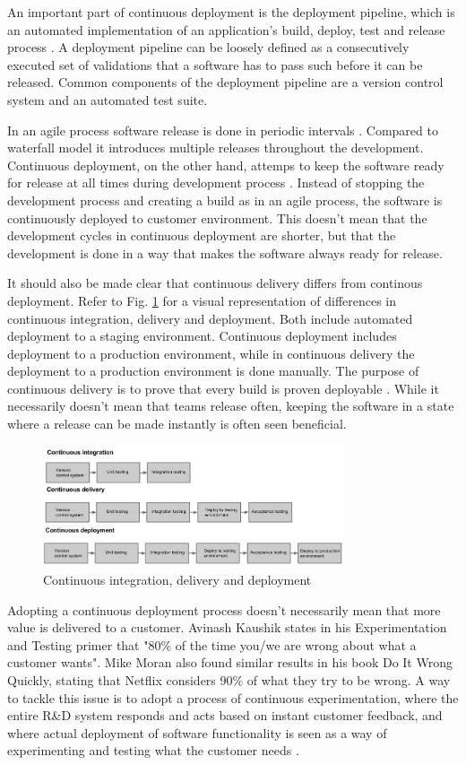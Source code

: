 \documentclass[conference]{IEEEtran}
\begin{document}
An important part of continuous deployment is the deployment pipeline, which is an automated implementation of an application's build, deploy, test and release process \cite{cdbook}. A deployment pipeline can be loosely defined as a consecutively executed set of validations that a software has to pass such before it can be released. Common components of the deployment pipeline are a version control system and an automated test suite.

In an agile process software release is done in periodic intervals \cite{cockburn2002agile}. Compared to waterfall model it introduces multiple releases throughout the development. Continuous deployment, on the other hand, attemps to keep the software ready for release at all times during development process \cite{cdbook}. Instead of stopping the development process and creating a build as in an agile process, the software is continuously deployed to customer environment. This doesn't mean that the development cycles in continuous deployment are shorter, but that the development is done in a way that makes the software always ready for release.

It should also be made clear that continuous delivery differs from continous deployment. Refer to Fig. \ref{fig1} for a visual representation of differences in continuous integration, delivery and deployment. Both include automated deployment to a staging environment. Continuous deployment includes deployment to a production environment, while in continuous delivery the deployment to a production environment is done manually. The purpose of continuous delivery is to prove that every build is proven deployable \cite{cdbook}. While it necessarily doesn't mean that teams release often, keeping the software in a state where a release can be made instantly is often seen beneficial.

\begin{figure}[!t]
	\centering
	\includegraphics[width=3.5in]{rtvd.jpg}
	\caption{Continuous integration, delivery and deployment}
	\label{fig1}
\end{figure}

Adopting a continuous deployment process doesn't necessarily mean that more value is delivered to a customer. Avinash Kaushik states in his Experimentation and Testing primer \cite{kaushik} that "80\% of the time you/we are wrong about what a customer wants". Mike Moran also found similar results in his book Do It Wrong Quickly, stating that Netflix considers 90\% of what they try to be wrong. A way to tackle this issue is to adopt a process of continuous experimentation, where the entire R\&D system responds and acts based on instant customer feedback, and where actual deployment of software functionality is seen as a way of experimenting and testing what the customer needs \cite{olsson2012climbing}.
 
\end{document}

